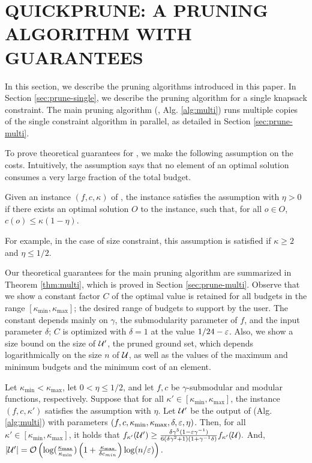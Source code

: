 \section{QUICKPRUNE: A PRUNING ALGORITHM WITH GUARANTEES} \label{sec:alg} 
In this section, we describe the pruning algorithms introduced in this paper.
In Section \ref{sec:prune-single},
we describe the pruning algorithm for a single knapsack constraint.
The main pruning algorithm (\qs, Alg. \ref{alg:multi}) runs multiple
copies of the single constraint algorithm in parallel, as detailed
in Section \ref{sec:prune-multi}.

To prove theoretical guarantees for \qs, we make
the following assumption on the costs. Intuitively, the assumption
says that no element of an optimal solution consumes a very large
fraction of the total budget. 
\begin{assumption}
  Given an instance $(f,c,\kappa)$ of \sm,
  the instance satisfies the assumption with $\eta > 0$
  if there exists an optimal solution $O$ to the
  instance, such that, for all $o \in O$, $c(o) \le \kappa (1-\eta)$.
\end{assumption}
For example, in the case of size constraint, this assumption is
satisfied if $\kappa \ge 2$ and $\eta \le 1/2$. 

Our theoretical guarantees for the main pruning algorithm are
summarized in Theorem \ref{thm:multi}, which is proved in Section \ref{sec:prune-multi}.
Observe that we show a constant factor $C$ of the optimal value is retained
for all budgets in the range $[\kappa_{\min}, \kappa_{\max}]$; the desired
range of budgets to support by the user. The constant
depends mainly on $\gamma$, the submodularity parameter of $f$,
and the input parameter $\delta$; $C$ is optimized
with $\delta = 1$ at the value $1/24 - \varepsilon$.
Also, we show a size bound on the size of $\mathcal{U}'$, the pruned ground set,
which depends logarithmically on the size $n$ of $\mathcal{U}$, as well as the values
of the maximum and minimum budgets and the minimum cost of an element. 
\begin{theorem} \label{thm:multi}
  Let $\kappa_{\min} < \kappa_{\max}$, let $0 < \eta \le 1/2$, and let $f, c$ be
  $\gamma$-submodular and modular functions, respectively.
  Suppose that for all $\kappa' \in [\kappa_{\min}, \kappa_{\max}]$,
  the instance $(f,c,\kappa')$ satisfies the \nhi assumption with $\eta$.
  Let $\mathcal{U}'$ be the output of \qs (Alg. \ref{alg:multi})
  with parameters
  $(f,c,\kappa_{\min},\kappa_{\max}, \delta, \varepsilon, \eta)$.
  Then, for all $\kappa' \in [\kappa_{\min}, \kappa_{\max}]$,
  it holds that
  $f_{\kappa'}( \mathcal{U}' ) \ge
  \frac{\delta \gamma^5(1 - \varepsilon \gamma^{-1})}{6(\delta \gamma^2 + 1)( 1 + \gamma^{-1} \delta ) }  f_{\kappa'}( \mathcal{U} ).$
  And, $| \mathcal{U}' | = \mathcal{O}\left(  \log( \frac{ \kappa_{\max} }{ \kappa_{\min} } ) \left( 1 + \frac{\kappa_{\max} }{\delta c_{min} } \right) \log ( n / \varepsilon )  \right).$
\end{theorem}
